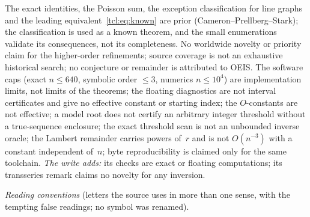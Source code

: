 \begin{writenote}
The exact identities, the Poisson sum, the exception classification for line
graphs and the leading equivalent~\eqref{tcl:eq:known} are prior
(Cameron--Prellberg--Stark); the classification is used as a known theorem,
and the small enumerations validate its consequences, not its completeness.
No worldwide novelty or priority claim for the higher-order refinements;
source coverage is not an exhaustive historical search; no conjecture or
remainder is attributed to OEIS. The software caps (exact $n\le640$, symbolic
order $\le3$, numerics $n\le10^4$) are implementation limits, not limits of
the theorems; the floating diagnostics are not interval certificates and give
no effective constant or starting index; the $O$-constants are not effective;
a model root does not certify an arbitrary integer threshold without a
true-sequence enclosure; the exact threshold scan is not an unbounded inverse
oracle; the Lambert remainder carries powers of~$r$ and is not $O(n^{-3})$
with a constant independent of~$n$; byte reproducibility is claimed only for
the same toolchain. \emph{The write adds:} its checks are exact or floating
computations; its transseries remark claims no novelty for any inversion.
\end{writenote}
\medskip
\begingroup\small
\noindent\emph{Reading conventions} (letters the source uses in more than one
sense, with the tempting false readings; no symbol was renamed).\par\smallskip
\renewcommand{\arraystretch}{1.1}
